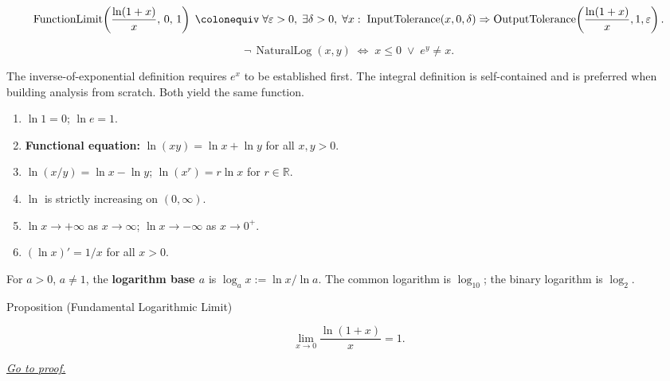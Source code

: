 \begin{remark*}
\[
  \operatorname{FunctionLimit}\!\left(\frac{\ln(1+x)}{x},\,0,\,1\right)
  \;\colonequiv\;
  \forall\varepsilon>0,\;\exists\delta>0,\;\forall x:\;
  \operatorname{InputTolerance}(x,0,\delta)
  \Rightarrow
  \operatorname{OutputTolerance}\!\left(\frac{\ln(1+x)}{x},1,\varepsilon\right).
\]
\end{remark*}

\begin{remark*}
\[
  \neg\,\operatorname{NaturalLog}(x,y)
  \;\iff\;
  x \leq 0 \;\vee\; e^y \neq x.
\]
\end{remark*}

\begin{remark*}
The inverse-of-exponential definition requires $e^x$ to be
established first. The integral definition is self-contained and
is preferred when building analysis from scratch. Both yield the
same function.
\end{remark*}

\begin{remark*}
\begin{enumerate}[label=(\roman*)]
  \item $\ln 1 = 0$;\; $\ln e = 1$.
  \item \textbf{Functional equation:} $\ln(xy) = \ln x + \ln y$
    for all $x, y > 0$.
  \item $\ln(x/y) = \ln x - \ln y$;\;
    $\ln(x^r) = r\ln x$ for $r \in \mathbb{R}$.
  \item $\ln$ is strictly increasing on $(0,\infty)$.
  \item $\ln x \to +\infty$ as $x \to \infty$;\;
    $\ln x \to -\infty$ as $x \to 0^+$.
  \item $(\ln x)' = 1/x$ for all $x > 0$.
\end{enumerate}
\end{remark*}

\begin{remark*}
For $a > 0$, $a \neq 1$, the \textbf{logarithm base $a$} is
$\log_a x := \ln x / \ln a$. The common logarithm is $\log_{10}$;
the binary logarithm is $\log_2$.
\end{remark*}


\begin{propositionbox}{Proposition (Fundamental Logarithmic Limit)}
\begin{proposition}
\label{prop:limit-logarithm-fundamental}
\[
  \lim_{x \to 0} \frac{\ln(1+x)}{x} = 1.
\]

\smallskip\noindent
\hyperref[prf:limit-logarithm-fundamental]{\textit{Go to proof.}}
\end{proposition}
\end{propositionbox}

